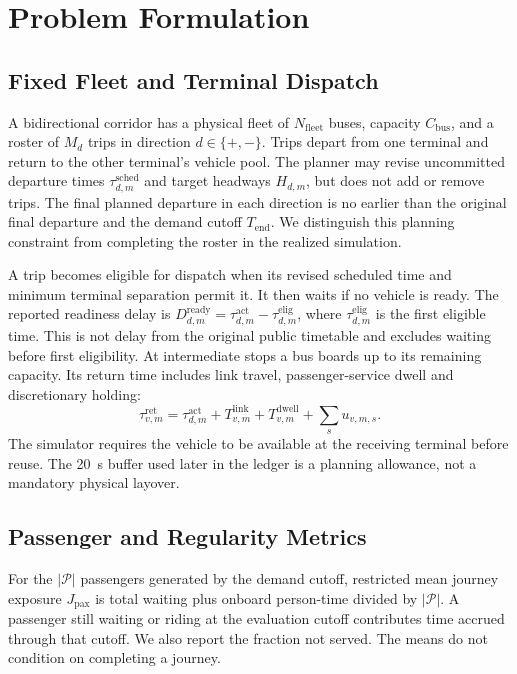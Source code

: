 \section{Problem Formulation}
\label{sec:problem}

\subsection{Fixed Fleet and Terminal Dispatch}
\label{sec:problem_corridor}

A bidirectional corridor has a physical fleet of $N_{\mathrm{fleet}}$ buses, capacity $C_{\mathrm{bus}}$, and a roster of $M_d$ trips in direction $d\in\{+,-\}$. Trips depart from one terminal and return to the other terminal's vehicle pool. The planner may revise uncommitted departure times $\tau_{d,m}^{\mathrm{sched}}$ and target headways $H_{d,m}$, but does not add or remove trips. The final planned departure in each direction is no earlier than the original final departure and the demand cutoff $T_{\mathrm{end}}$. We distinguish this planning constraint from completing the roster in the realized simulation.

A trip becomes eligible for dispatch when its revised scheduled time and minimum terminal separation permit it. It then waits if no vehicle is ready. The reported readiness delay is $D_{d,m}^{\mathrm{ready}}=\tau_{d,m}^{\mathrm{act}}-\tau_{d,m}^{\mathrm{elig}}$, where $\tau_{d,m}^{\mathrm{elig}}$ is the first eligible time. This is not delay from the original public timetable and excludes waiting before first eligibility. At intermediate stops a bus boards up to its remaining capacity. Its return time includes link travel, passenger-service dwell and discretionary holding:
\begin{equation}
  \tau^{\mathrm{ret}}_{v,m} = \tau^{\mathrm{act}}_{d,m} + T^{\mathrm{link}}_{v,m}
      + T^{\mathrm{dwell}}_{v,m} + \sum_s u_{v,m,s}.
  \label{eq:return_time}
\end{equation}
The simulator requires the vehicle to be available at the receiving terminal before reuse. The 20~s buffer used later in the ledger is a planning allowance, not a mandatory physical layover.

\subsection{Passenger and Regularity Metrics}
\label{sec:problem_metrics}

For the $|\mathcal{P}|$ passengers generated by the demand cutoff, restricted mean journey exposure $J_{\mathrm{pax}}$ is total waiting plus onboard person-time divided by $|\mathcal{P}|$. A passenger still waiting or riding at the evaluation cutoff contributes time accrued through that cutoff. We also report the fraction not served. The means do not condition on completing a journey.

